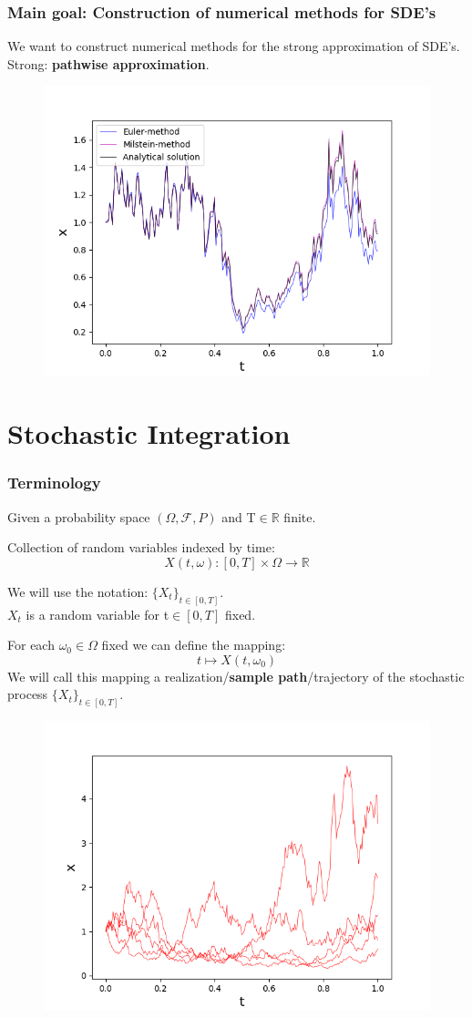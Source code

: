 \begin{frame}
\frametitle{Main goal: Construction of numerical methods for SDE's}
We want to construct numerical methods for the strong approximation of SDE's.\\
Strong: \textbf{pathwise approximation}.
\begin{figure}
\includegraphics[width=0.6\linewidth]{Content/Graphics/slides/ApproximateSolution}
\end{figure}
\end{frame}







\section{Stochastic Integration} 
\begin{frame}
\frametitle{Terminology}
Given a probability space \(\left( \Omega , \mathcal{F}, P\right)\) and T\(\in\mathbb{R}\) finite.
\begin{definition}
Collection of random variables indexed by time:
\[X(t,\omega)\!: [0,T]\times\Omega \rightarrow \mathbb{R}\]
\end{definition}
We will use the notation: \(\{X_t\}_{t\in[0,T]}\).\\
\(X_t\) is a random variable for t\(\in[0,T]\) fixed.
\end{frame}

\begin{frame}
For each \(\omega_0\in\Omega\) fixed we can define the mapping:
\[t\mapsto X(t,\omega_0)\]
We will call this mapping a realization/\textbf{sample path}/trajectory of the stochastic process \(\{X_t\}_{t\in[0,T]}\).
\begin{figure}
\includegraphics[width=0.6\linewidth]{Content/Graphics/slides/ExampleSamplePaths}
\end{figure}
\end{frame}


